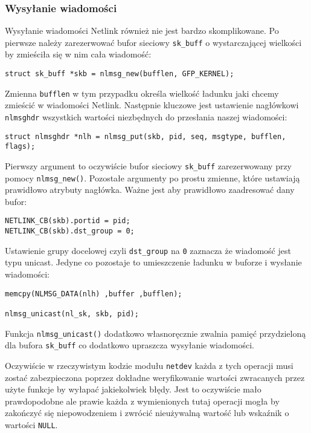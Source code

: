 \documentclass[10pt]{article}
\begin{document}
\subsubsection{Wysyłanie wiadomości}

Wysyłanie wiadomości Netlink również nie jest bardzo skomplikowane. Po pierwsze należy zarezerwować bufor sieciowy \texttt{sk\_buff} o wystarczającej wielkości by zmieściła się w nim cała wiadomość:

\begin{verbatim}
struct sk_buff *skb = nlmsg_new(bufflen, GFP_KERNEL);
\end{verbatim}

Zmienna \texttt{bufflen} w tym przypadku określa wielkość ładunku jaki chcemy zmieścić w wiadomości Netlink. Następnie kluczowe jest ustawienie nagłówkowi \texttt{nlmsghdr} wszystkich wartości niezbędnych do przesłania naszej wiadomości:

\begin{verbatim}
struct nlmsghdr *nlh = nlmsg_put(skb, pid, seq, msgtype, bufflen, flags);
\end{verbatim}

Pierwszy argument to oczywiście bufor sieciowy \texttt{sk\_buff} zarezerwowany przy pomocy \texttt{nlmsg\_new()}. Pozostałe argumenty po prostu zmienne, które ustawiają prawidłowo atrybuty nagłówka. Ważne jest aby prawidłowo zaadresować dany bufor:

\begin{verbatim}
NETLINK_CB(skb).portid = pid;
NETLINK_CB(skb).dst_group = 0;
\end{verbatim}

Ustawienie grupy docelowej czyli \texttt{dst\_group} na \texttt{0} zaznacza że wiadomość jest typu unicast. Jedyne co pozostaje to umieszczenie ładunku w buforze i wysłanie wiadomości:

\begin{verbatim}
memcpy(NLMSG_DATA(nlh) ,buffer ,bufflen);

nlmsg_unicast(nl_sk, skb, pid);
\end{verbatim}

Funkcja \texttt{nlmsg\_unicast()} dodatkowo własnoręcznie zwalnia pamięć przydzieloną dla bufora \texttt{sk\_buff} co dodatkowo upraszcza wysyłanie wiadomości.

Oczywiście w rzeczywistym kodzie modułu \texttt{netdev} każda z tych operacji musi zostać zabezpieczona poprzez dokładne weryfikowanie wartości zwracanych przez użyte funkcje by wyłapać jakiekolwiek błędy.  Jest to oczywiście mało prawdopodobne ale prawie każda z wymienionych tutaj operacji mogła by zakończyć się niepowodzeniem i zwrócić nieużywalną wartość lub wskaźnik o wartości \texttt{NULL}.
\end{document}
